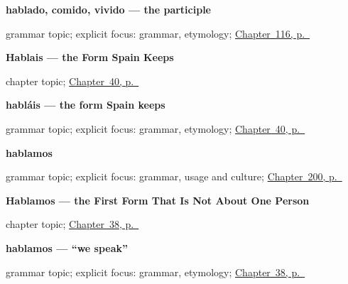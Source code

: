\noindent\begin{minipage}[t]{\linewidth}
\raggedright
\textbf{hablado, comido, vivido — the participle}\par
\footnotesize grammar topic; explicit focus: grammar, etymology; \hyperref[ch:participle]{Chapter~116, p.~\pageref*{ch:participle}}
\end{minipage}\par\smallskip

\noindent\begin{minipage}[t]{\linewidth}
\raggedright
\textbf{Hablais --- the Form Spain Keeps}\par
\footnotesize chapter topic; \hyperref[ch:spanish-hablais]{Chapter~40, p.~\pageref*{ch:spanish-hablais}}
\end{minipage}\par\smallskip

\noindent\begin{minipage}[t]{\linewidth}
\raggedright
\textbf{habláis — the form Spain keeps}\par
\footnotesize grammar topic; explicit focus: grammar, etymology; \hyperref[ch:spanish-hablais]{Chapter~40, p.~\pageref*{ch:spanish-hablais}}
\end{minipage}\par\smallskip

\noindent\begin{minipage}[t]{\linewidth}
\raggedright
\textbf{hablamos}\par
\footnotesize grammar topic; explicit focus: grammar, usage and culture; \hyperref[ch:hablamos-dos]{Chapter~200, p.~\pageref*{ch:hablamos-dos}}
\end{minipage}\par\smallskip

\noindent\begin{minipage}[t]{\linewidth}
\raggedright
\textbf{Hablamos --- the First Form That Is Not About One Person}\par
\footnotesize chapter topic; \hyperref[ch:spanish-hablamos]{Chapter~38, p.~\pageref*{ch:spanish-hablamos}}
\end{minipage}\par\smallskip

\noindent\begin{minipage}[t]{\linewidth}
\raggedright
\textbf{hablamos — \textquotedblleft{}we speak\textquotedblright{}}\par
\footnotesize grammar topic; explicit focus: grammar, etymology; \hyperref[ch:spanish-hablamos]{Chapter~38, p.~\pageref*{ch:spanish-hablamos}}
\end{minipage}\par\smallskip

